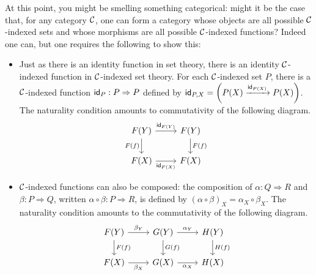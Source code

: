 At this point, you might be smelling something categorical: 
might it be the case that, for any category $\mathcal C$, 
one can form a category whose objects are all possible $\mathcal C$-indexed 
sets and whose morphisms are all possible $\mathcal C$-indexed functions? 
Indeed one can, but one requires the following to show this:

\begin{itemize}
\item Just as there is an identity function in set theory,
  there is an identity \(\mathcal C\)-indexed function in \(\mathcal C\)-indexed set theory.
  For each \(\mathcal C\)-indexed set \(P\),
  there is a \(\mathcal C\)-indexed function \(\mathsf{id}_P : P \Rightarrow P\)
  defined by \(\mathsf{id}_{P,X} = \left(P(X) \xrightarrow{\mathsf{id}_{P(X)}} P(X)\right)\).
  The naturality condition amounts to commutativity of the following diagram.
  \[%
\begin{tikzcd}
F(Y) \arrow[r, "\idt_{F(Y)}"] \arrow[d, "F(f)"'] & F(Y) \arrow[d, "F(f)"] \\
F(X) \arrow[r, "\idt_{F(X)}"']                 & F(X)
\end{tikzcd}\]
\item \(\mathcal C\)-indexed functions can also be composed:
  the composition of \(\alpha : Q \Rightarrow R\)
  and \(\beta: P \Rightarrow Q\),
  written \(\alpha\circ\beta : P \Rightarrow R\),
  is defined by \((\alpha\circ\beta)_X = \alpha_X \circ \beta_X\).
  The naturality condition amounts to the commutativity of the following diagram.
  \[
\begin{tikzcd}
F(Y) \arrow[d, "F(f)"] \arrow[r, "\beta_Y"] & G(Y) \arrow[d, "G(f)"] \arrow[r, "\alpha_Y"] & H(Y) \arrow[d, "H(f)"] \\
F(X) \arrow[r, "\beta_X"']                & G(X) \arrow[r, "\alpha_X"']                & H(X)
\end{tikzcd}
\]
\end{itemize}

